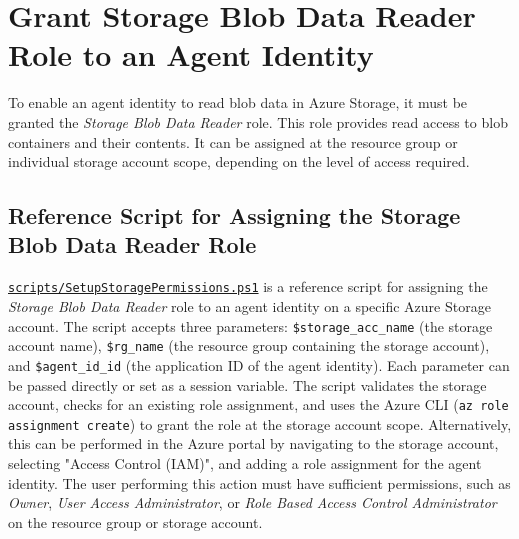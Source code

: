 \documentclass[9pt]{extarticle}%
\begin{document}
\section{Grant Storage Blob Data Reader Role to an Agent Identity}%
To enable an agent identity to read blob data in Azure Storage, it must be granted the \textit{Storage Blob Data Reader} role. This role provides read access to blob containers and their contents. It can be assigned at the resource group or individual storage account scope, depending on the level of access required.
%
\par\vspace{\baselineskip}%
\subsection{Reference Script for Assigning the Storage Blob Data Reader Role}%
\href{https://github.com/dennisseah/agent-identity/blob/main/scripts/SetupStoragePermissions.ps1}{\texttt{scripts/SetupStoragePermissions.ps1}} is a reference script for assigning the \textit{Storage Blob Data Reader} role to an agent identity on a specific Azure Storage account. The script accepts three parameters: \texttt{\$storage\_acc\_name} (the storage account name), \texttt{\$rg\_name} (the resource group containing the storage account), and \texttt{\$agent\_id\_id} (the application ID of the agent identity). Each parameter can be passed directly or set as a session variable. The script validates the storage account, checks for an existing role assignment, and uses the Azure CLI (\texttt{az role assignment create}) to grant the role at the storage account scope. Alternatively, this can be performed in the Azure portal by navigating to the storage account, selecting "Access Control (IAM)", and adding a role assignment for the agent identity. The user performing this action must have sufficient permissions, such as \textit{Owner}, \textit{User Access Administrator}, or \textit{Role Based Access Control Administrator} on the resource group or storage account.
%
\par\vspace{\baselineskip}%
\end{document}
